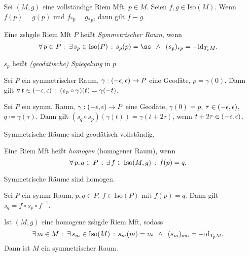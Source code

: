 \documentclass{cheat-sheet}
\newcommand{\vinterval}{\ointerval{-\epsilon}{\epsilon}} %
\newcommand{\Iso}{\mathrm{Iso}} %
\begin{document}
\begin{prop}
  Sei $(M, g)$ eine vollständige Riem Mft, $p \in M$. Seien $f, g \in \Iso(M)$. Wenn $f(p) = g(p)$ und $f_{*p} = g_{*p}$, dann gilt $f \equiv g$.
\end{prop}

\begin{defn}
  Eine zshgde Riem Mft $P$ heißt \emph{Symmetrischer Raum}, wenn
  \[
    \fa{p \in P} \ex{s_p \in \Iso(P)}
    s_p(p) = ß \enspace \wedge \enspace (s_p)_{*p} = - \id_{T_p M}.
  \]
\end{defn}

\begin{sprech}
  $s_p$ heißt \emph{(geodätische) Spiegelung} in $p$.
\end{sprech}

\begin{lem}
  Sei $P$ ein symmetrischer Raum, $\gamma : \vinterval \to P$ eine Geodäte, $p = \gamma(0)$. Dann gilt
  $\fa{t \in \vinterval} (s_p \circ \gamma)(t) = \gamma(-t)$.
\end{lem}

\begin{lem}
  Sei $P$ ein symm. Raum, $\gamma : \vinterval \to P$ eine Geodäte, $\gamma(0) = p$, $\tau \in \vinterval$, $q \coloneqq \gamma(\tau)$. Dann gilt $(s_q \circ s_p)(\gamma(t)) = \gamma(t + 2 \tau)$, wenn $t + 2 \tau \in \vinterval$.
\end{lem}

\begin{kor}
  Symmetrische Räume sind geodätisch vollständig.
\end{kor}

\begin{defn}
  Eine Riem Mft heißt \emph{homogen} (homogener Raum), wenn
  \[ \fa{p, q \in P} \ex{f \in \Iso(M, g)} f(p) = q. \]
\end{defn}

\begin{lem}
  Symmetrische Räume sind homogen.
\end{lem}

\begin{lem}
  Sei $P$ ein symm Raum, $p, q \in P$, $f \in \Iso(P)$ mit $f(p) = q$. Dann gilt $s_q = f \circ s_p \circ f^{-1}$.
\end{lem}

\begin{kor}
  Ist $(M, g)$ eine homogene zshgde Riem Mft, sodass
  \[ \ex{m \in M} \ex{s_m \in \Iso(M)} s_m(m) = m \enspace \wedge \enspace (s_m)_{*m} = - \id_{T_p M}. \]
  Dann ist $M$ ein symmetrischer Raum.
\end{kor}
\end{document}
